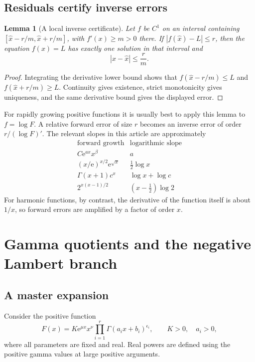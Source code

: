 \documentclass[11pt,a4paper]{article}
\numberwithin{equation}{section}
\newtheorem{lemma}[theorem]{Lemma}
\theoremstyle{definition}
\theoremstyle{remark}
\newcommand{\ee}{\mathrm e}
\begin{document}
\subsection{Residuals certify inverse errors}

\begin{lemma}[A local inverse certificate]
\label{lem:residual}
Let $f$ be $C^1$ on an interval containing
$[\widehat x-r/m,\widehat x+r/m]$, with $f'(x)\ge m>0$ there. If
$|f(\widehat x)-L|\le r$, then the equation $f(x)=L$ has exactly one solution in that interval and
\begin{equation}
 |x-\widehat x|\le\frac{r}{m}.
 \label{eq:residual}
\end{equation}
\end{lemma}
\begin{proof}
Integrating the derivative lower bound shows that $f(\widehat x-r/m)\le L$ and $f(\widehat x+r/m)\ge L$. Continuity gives existence, strict monotonicity gives uniqueness, and the same derivative bound gives the displayed error.
\end{proof}

For rapidly growing positive functions it is usually best to apply this lemma to $f=\log F$. A relative forward error of size $r$ becomes an inverse error of order $r/(\log F)'$. The relevant slopes in this article are approximately
\[
 \begin{array}{c|c}
 \text{forward growth}&\text{logarithmic slope}\\\hline
 C\ee^{ax}x^\beta&a\\
 (x/\ee)^{x/2}\ee^{\sqrt x}&\tfrac12\log x\\
 \Gamma(x+1)c^x&\log x+\log c\\
 2^{x(x-1)/2}&(x-\tfrac12)\log2
 \end{array}
\]
For harmonic functions, by contrast, the derivative of the function itself is about $1/x$, so forward errors are amplified by a factor of order $x$.

\section{Gamma quotients and the negative Lambert branch}
\label{sec:gamma}

\subsection{A master expansion}

Consider the positive function
\begin{equation}
 F(x)=K\ee^{\mu x}x^\nu
       \prod_{i=1}^r\Gamma(a_ix+b_i)^{\epsilon_i},
 \qquad K>0,\quad a_i>0,
 \label{eq:gamma-general}
\end{equation}
where all parameters are fixed and real. Real powers are defined using the positive gamma values at large positive arguments.
\end{document}
